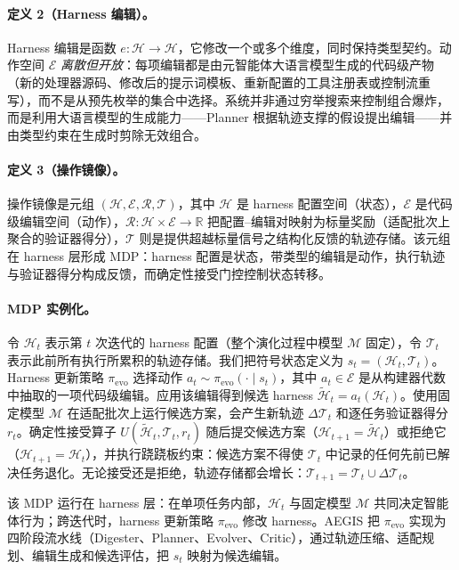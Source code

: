 \paragraph{定义 2（Harness 编辑）。}
Harness 编辑是函数 $e:\mathcal{H}\to\mathcal{H}$，它修改一个或多个维度，同时保持类型契约。动作空间 $\mathcal{E}$ \textit{离散但开放}：每项编辑都是由元智能体大语言模型生成的代码级产物（新的处理器源码、修改后的提示词模板、重新配置的工具注册表或控制流重写），而不是从预先枚举的集合中选择。系统并非通过穷举搜索来控制组合爆炸，而是利用大语言模型的生成能力——Planner 根据轨迹支撑的假设提出编辑——并由类型约束在生成时剪除无效组合。

\paragraph{定义 3（操作镜像）。}
操作镜像是元组 $(\mathcal{H},\mathcal{E},\mathcal{R},\mathcal{T})$，其中 $\mathcal{H}$ 是 harness 配置空间（状态），$\mathcal{E}$ 是代码级编辑空间（动作），$\mathcal{R}:\mathcal{H}\times\mathcal{E}\to\mathbb{R}$ 把配置--编辑对映射为标量奖励（适配批次上聚合的验证器得分），$\mathcal{T}$ 则是提供超越标量信号之结构化反馈的轨迹存储。该元组在 harness 层形成 MDP：harness 配置是状态，带类型的编辑是动作，执行轨迹与验证器得分构成反馈，而确定性接受门控控制状态转移。

\paragraph{MDP 实例化。}
令 $\mathcal{H}_t$ 表示第 $t$ 次迭代的 harness 配置（整个演化过程中模型 $\mathcal{M}$ 固定），令 $\mathcal{T}_t$ 表示此前所有执行所累积的轨迹存储。我们把符号状态定义为 $s_t=(\mathcal{H}_t,\mathcal{T}_t)$。Harness 更新策略 $\pi_{\mathrm{evo}}$ 选择动作 $a_t\sim\pi_{\mathrm{evo}}(\cdot\mid s_t)$，其中 $a_t\in\mathcal{E}$ 是从构建器代数中抽取的一项代码级编辑。应用该编辑得到候选 harness $\widetilde{\mathcal{H}}_t=a_t(\mathcal{H}_t)$。使用固定模型 $\mathcal{M}$ 在适配批次上运行候选方案，会产生新轨迹 $\Delta\mathcal{T}_t$ 和逐任务验证器得分 $r_t$。确定性接受算子 $U(\widetilde{\mathcal{H}}_t,\mathcal{T}_t,r_t)$ 随后提交候选方案（$\mathcal{H}_{t+1}=\widetilde{\mathcal{H}}_t$）或拒绝它（$\mathcal{H}_{t+1}=\mathcal{H}_t$），并执行跷跷板约束：候选方案不得使 $\mathcal{T}_t$ 中记录的任何先前已解决任务退化。无论接受还是拒绝，轨迹存储都会增长：$\mathcal{T}_{t+1}=\mathcal{T}_t\cup\Delta\mathcal{T}_t$。

该 MDP 运行在 harness 层：在单项任务内部，$\mathcal{H}_t$ 与固定模型 $\mathcal{M}$ 共同决定智能体行为；跨迭代时，harness 更新策略 $\pi_{\mathrm{evo}}$ 修改 harness。AEGIS 把 $\pi_{\mathrm{evo}}$ 实现为四阶段流水线（Digester、Planner、Evolver、Critic），通过轨迹压缩、适配规划、编辑生成和候选评估，把 $s_t$ 映射为候选编辑。

